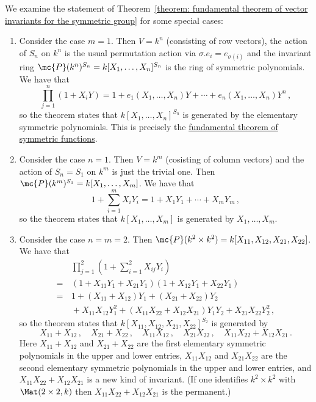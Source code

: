\begin{example}
  We examine the statement of Theorem~\ref{theorem: fundamental theorem of vector invariants for the symmetric group} for some special cases:
  \begin{enumerate}
    \item
      Consider the case $m = 1$.
      Then $V = k^n$ (consisting of row vectors), the action of $S_n$ on $k^n$ is the usual permutation action via $\sigma.e_i = e_{\sigma(i)}$ and the invariant ring $\mc{P}(k^n)^{S_n} = k[X_1, \dotsc, X_n]^{S_n}$ is the ring of symmetric polynomials.
      We have that
      \[
          \prod_{j=1}^n ( 1 + X_i Y )
        = 1 + e_1(X_1, \dotsc, X_n) Y + \dotsb + e_n(X_1, \dotsc, X_n) Y^n \,,
      \]
      so the theorem states that $k[X_1, \dotsc, X_n]^{S_n}$ is generated by the elementary symmetric polynomials.
      This is precisely the \hyperref[theorem: fundamental theorem of symmetric functions]{fundamental theorem of symmetric functions}.
    \item
      Consider the case $n = 1$.
      Then $V = k^m$ (cosisting of column vectors) and the action of $S_n = S_1$ on $k^m$ is just the trivial one.
      Then $\mc{P}(k^m)^{S_1} = k[X_1, \dotsc, X_m]$.
      We have that
      \[
          1 + \sum_{i=1}^m X_i Y_i
        = 1 + X_1 Y_1 + \dotsb + X_m Y_m \,,
      \]
      so the theorem states that $k[X_1, \dotsc, X_m]$ is generated by $X_1, \dotsc, X_m$.
    \item
      Consider the case $n = m = 2$.
      Then $\mc{P}(k^2 \times k^2) = k[X_{11}, X_{12}, X_{21}, X_{22}]$.
      We have that
      \begin{align*}
         &\,  \prod_{j=1}^2 \left( 1 + \sum_{i=1}^2 X_{ij} Y_i \right)  \\
        =&\,  (1 + X_{11} Y_1 + X_{21} Y_1)(1 + X_{12} Y_1 + X_{22} Y_1)  \\
        =&\,  1
              + (X_{11} + X_{12}) Y_1 + (X_{21} + X_{22}) Y_2 \\
         &\,  + X_{11} X_{12} Y_1^2 + (X_{11} X_{22} + X_{12} X_{21}) Y_1 Y_2 + X_{21} X_{22} Y_2^2 \,,
      \end{align*}
      so the theorem states that $k[X_{11}, X_{12}, X_{21}, X_{22}]^{S_2}$ is generated by
      \[
        X_{11} + X_{12} \,,
        \quad
        X_{21} + X_{22} \,,
        \quad
        X_{11} X_{12} \,,
        \quad
        X_{21} X_{22} \,,
        \quad
        X_{11} X_{22} + X_{12} X_{21} \,.
      \]
      Here $X_{11} + X_{12}$ and $X_{21} + X_{22}$ are the first elementary symmetric polynomials in the upper and lower entries, $X_{11} X_{12}$ and $X_{21} X_{22}$ are the second elementary symmetric polynomials in the upper and lower entries, and $X_{11} X_{22} + X_{12} X_{21}$ is a new kind of invariant.
      (If one identifies $k^2 \times k^2$ with $\Mat(2 \times 2, k)$ then $X_{11} X_{22} + X_{12} X_{21}$ is the permanent.)
  \end{enumerate}
\end{example}


